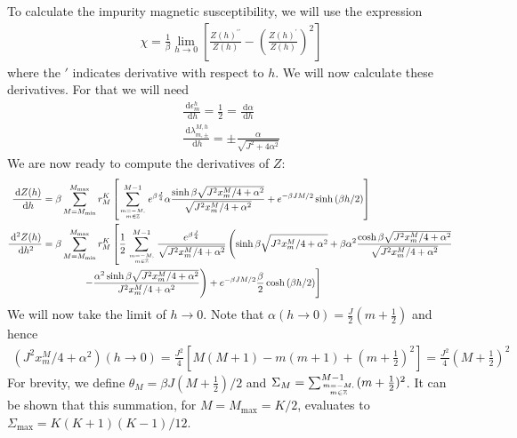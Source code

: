 \documentclass[12pt]{revtex4-2}
\begin{document}
To calculate the impurity magnetic susceptibility, we will use the expression
\begin{align}
	\chi = \frac{1}{\beta}\lim_{h \to 0}\left[\frac{Z(h)^{\prime\prime}}{Z(h)} - \left(\frac{Z(h)^{\prime}}{Z(h)}\right)^2 \right] 
\end{align}
where the \(\prime\) indicates derivative with respect to \(h\). We will now calculate these derivatives. For that we will need
\begin{gather}
	\frac{\:\mathrm{d}\epsilon_m^h}{\:\mathrm{d}h} = \frac{1}{2} = \frac{\:\mathrm{d}\alpha}{\:\mathrm{d}h}\\
	\frac{\:\mathrm{d}\lambda_{m,\pm}^{M, h}}{\:\mathrm{d}h} = \pm\frac{\alpha}{\sqrt{J^2 + 4\alpha^2}}
\end{gather}
We are now ready to compute the derivatives of \(Z\):
\begin{align}
	\frac{\:\mathrm{d}Z(h)}{\:\mathrm{d}h} &= \beta\sum_{M=M_\text{min}}^{M_\text{max}}r^K_M\left[\sum_{m=-M, \atop{m\in \mathbb{Z}}}^{M-1}e^{\beta \frac{J}{4}}\alpha\frac{\sinh \beta\sqrt{J^2x^M_m/4 + \alpha^2} }{\sqrt{J^2x^M_m/4 + \alpha^2}} + e^{-\beta JM/2}\sinh \left(\beta h/2\right)\right] \\
	\frac{\:\mathrm{d}^2Z(h)}{\:\mathrm{d}h^2} &= \beta\sum_{M=M_\text{min}}^{M_\text{max}}r^K_M\left[\frac{1}{2}\sum_{m=-M, \atop{m\in \mathbb{Z}}}^{M-1}\frac{e^{\beta \frac{J}{4}}}{\sqrt{J^2x^M_m/4 + \alpha^2}}\left(\sinh \beta\sqrt{J^2x^M_m/4 + \alpha^2} + \beta\alpha^2 \frac{\cosh\beta\sqrt{J^2x^M_m/4 + \alpha^2}}{\sqrt{J^2x^M_m/4 + \alpha^2}}\right.\right.\\
						   &\quad \quad\quad \quad\left.\left. - \frac{\alpha^2 \sinh \beta\sqrt{J^2x^M_m/4 + \alpha^2}}{J^2x^M_m/4 + \alpha^2}\right) + e^{-\beta JM/2}\frac{\beta}{2}\cosh \left(\beta h/2\right)\right] \\
\end{align}
We will now take the limit of \(h \to 0\). Note that \(\alpha(h\to 0)=\frac{J}{2}(m+\frac{1}{2})\) and hence 
\begin{align}
	(J^2x^M_m/4 + \alpha^2)(h \to 0) = \frac{J^2}{4}\left[M(M+1) - m(m+1) + (m+\frac{1}{2})^2\right] = \frac{J^2}{4}\left( M + \frac{1}{2} \right)^2
\end{align}
For brevity, we define \(\theta_M = \beta J (M+\frac{1}{2})/2\) and \(\Sigma_M = \sum_{m=-M, \atop{m\in \mathbb{Z}}}^{M-1}(m+\frac{1}{2})^2\). It can be shown that this summation, for \(M=M_\text{max}=K/2\), evaluates to \(\Sigma_\text{max} = K(K+1)(K-1)/12\).
\end{document}
